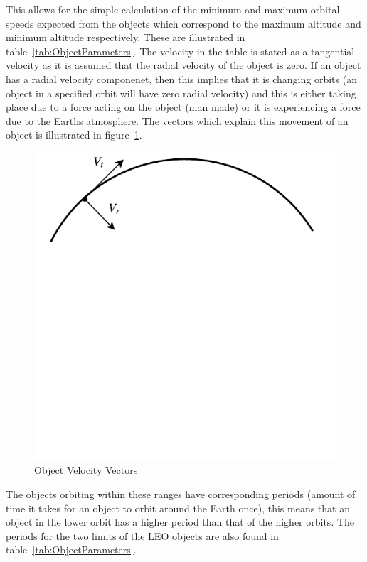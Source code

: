 \documentclass[11pt]{witseiepaper}
\begin{document}
This allows for the simple calculation of the minimum and maximum orbital speeds expected from the objects which correspond to the maximum altitude and minimum altitude respectively. These are illustrated in table~\ref{tab:ObjectParameters}. The velocity in the table is stated as a tangential velocity as it is assumed that the radial velocity of the object is zero. If an object has a radial velocity componenet, then this implies that it is changing orbits (an object in a specified orbit will have zero radial velocity) and this is either taking place due to a force acting on the object (man made) or it is experiencing a force due to the Earths atmosphere. The vectors which explain this movement of an object is illustrated in figure~\ref{fig:ObjectVelocityVectors}.

\begin{center}
    \begin{figure}
        \includegraphics[width=\textwidth]{Vectors.pdf}
        \caption{Object Velocity Vectors}
        \label{fig:ObjectVelocityVectors}    
    \end{figure}
\end{center}

The objects orbiting within these ranges have corresponding periods (amount of time it takes for an object to orbit around the Earth once), this means that an object in the lower orbit has a higher period than that of the higher orbits. The periods for the two limits of the LEO objects are also found in table~\ref{tab:ObjectParameters}.
\end{document}
